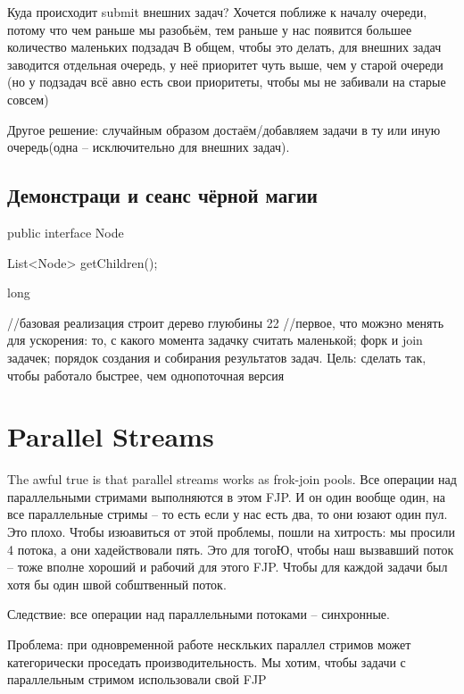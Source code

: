 Куда происходит submit внешних задач? 
Хочется поближе к началу очереди, потому что чем раньше мы разобьём, тем раньше у нас появится большее количество маленьких подзадач
В общем, чтобы это делать, для внешних задач заводится отдельная очередь, у неё приоритет чуть выше, чем у старой очереди
(но у подзадач всё авно есть свои приоритеты, чтобы мы не забивали на старые совсем)

Другое решение: случайным образом достаём/добавляем задачи в ту или иную очередь(одна -- исключительно для внешних задач).

\subsection{Демонстраци и сеанс чёрной магии}

\begin{javacode}
public interface Node {
	List<Node> getChildren();

	long 
}
//базовая реализация строит дерево глуюбины 22
//первое, что можэно менять для ускорения: 
то, с какого момента задачку считать маленькой;
форк и join задачек;
порядок создания и собирания результатов задач.
Цель: сделать так, чтобы работало быстрее, чем однопоточная версия 
\end{javacode}

\section{Parallel Streams}
The awful true is that parallel streams works as frok-join pools.
Все операции над параллельными стримами выполняются в этом FJP.
И он один вообще один, на все параллельные стримы -- то есть если у нас есть два, то они юзают один пул.
Это плохо.
Чтобы изюавиться от этой проблемы, пошли на хитрость: мы просили 4 потока, а они хадействовали пять.
Это для тогоЮ, чтобы наш вызвавший поток -- тоже вполне хороший и рабочий для этого FJP.
Чтобы для каждой задачи был хотя бы один швой собштвенный поток.

Следствие: все операции над параллельными потоками -- синхронные.

Проблема: при одновременной работе нескльких параллел стримов может категорически проседать производительность.
Мы хотим, чтобы задачи с параллельным стримом использовали свой FJP


